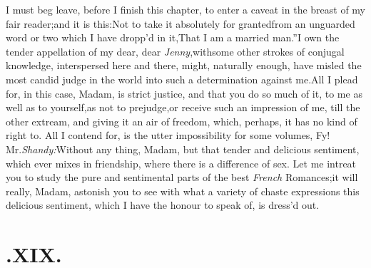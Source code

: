 \documentclass{article}
\begin{document}
I must beg leave, before I finish this chapter, to enter a
caveat in the breast of my fair reader;\tsk and it is
this:\tsh\break Not to take it absolutely for granted\break from an
unguarded word or two which I have dropp’d in
it,\tsh\lqq That I am a married
man.”\tsk I own the tender appel\-lation of my dear, dear
\textit{Jenny},\tsk with\break some other strokes of conjugal know\-ledge,
interspersed here and there, might, naturally enough, have misled
the most candid judge in the world into such a determination
against me.\tsk All I plead for, in this case, Madam, is strict
justice, and that you do so much of it, to me as well as to
yourself,\tsk as not to prejudge,\break or receive such an impression
of me, till
the other
extream, and giving it an air of freedom, which, perhaps, it has no
kind of right to. All I contend for, is the utter impossibility
for some volumes, 
Fy! Mr.\@ \textit{Shandy:}\tsk Without
any thing, Madam, but that tender and delicious\break
sentiment, which ever mixes in friend\-ship, where there is a difference of sex.\break
Let me intreat you to study the pure\break
and sentimental parts of the best \textit{French}\break 
Romances;\tsh it will really, Madam,\break
astonish you to see with what a variety of chaste expressions
this delicious sentiment, which I have the honour to speak of,
is dress’d out.

\null
\section{.\enspace XIX.}
\end{document}
